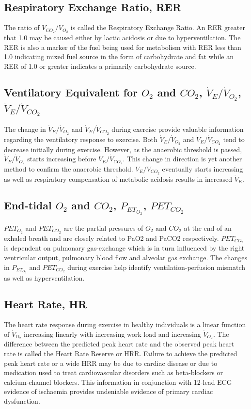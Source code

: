 \subsection{Respiratory Exchange Ratio, RER}
The ratio of $\dot{V}_{CO_2}/\dot{V}_{O_2}$ is called the Respiratory Exchange Ratio. An RER greater that 1.0 may be caused either by lactic acidosis or due to hyperventilation. The RER is also a marker of the fuel being used for metabolism with RER less than 1.0 indicating mixed fuel source in the form of carbohydrate and fat while an RER of 1.0 or greater indicates a primarily carbohydrate source.

\subsection{Ventilatory Equivalent for $O_2$ and $CO_2$, $\dot{V}_E/\dot{V}_{O_2}$, $\dot{V}_E/\dot{V}_{CO_2}$}
The change in $\dot{V}_E/\dot{V}_{O_2}$ and $\dot{V}_E/\dot{V}_{CO_2}$ during exercise provide valuable information regarding the ventilatory response to exercise. Both $\dot{V}_E/\dot{V}_{O_2}$ and $\dot{V}_E/\dot{V}_{CO_2}$ tend to decrease initially during exercise. However, as the anaerobic threshold is passed, $\dot{V}_E/\dot{V}_{O_2}$ starts increasing before $\dot{V}_E/\dot{V}_{CO_2}$. This change in direction is yet another method to confirm the anaerobic threshold.  $\dot{V}_E/\dot{V}_{CO_2}$ eventually starts increasing as well as respiratory compensation of metabolic acidosis results in increased $\dot{V}_E$.

\subsection{End-tidal $O_2$ and $CO_2$, $P_{ET_{O_2}}$, $P{ET_{CO_2}}$}
$PET_{O_2}$ and $PET_{CO_2}$ are the partial pressures of $O_2$ and $CO_2$ at the end of an exhaled breath and are closely related to PaO2 and PaCO2 respectively. $P{ET_{CO_2}}$ is dependent on pulmonary gas-exchange which is in turn influenced by the right ventricular output, pulmonary blood flow and alveolar gas exchange. The changes in $P_{ET_{O_2}}$ and $P{ET_{CO_2}}$ during exercise help identify ventilation-perfusion mismatch as well as hyperventilation.

\subsection{Heart Rate, HR}
\label{sec:heart_rate}
The heart rate response during exercise in healthy individuals is a linear function of $\dot{V}_{O_2}$ increasing linearly with increasing work load and increasing $\dot{V}_{O_2}$. The difference between the predicted peak heart rate and the observed peak heart rate is called the Heart Rate Reserve or HRR. Failure to achieve the predicted peak heart rate or a wide HRR may be due to cardiac disease or due to medication used to treat cardiovascular disorders such as beta-blockers or calcium-channel blockers. This information in conjunction with 12-lead ECG evidence of ischaemia provides undeniable evidence of primary cardiac dysfunction.

